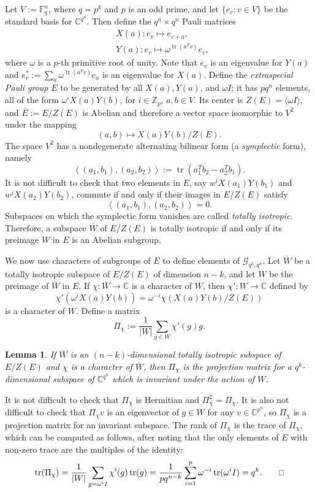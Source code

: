 \documentclass[12pt]{article}
\numberwithin{equation}{section}
\theoremstyle{plainsl}
\newtheorem{lemma}[theorem]{Lemma}
\renewenvironment{proof}{\noindent{{\sl Proof. }}}{\medbreak}
\def\sqr#1#2{{\vbox{\hrule height.#2pt
    \hbox{\vrule width.#2pt height#1pt \kern#1pt
        \vrule width.#2pt}\hrule height.#2pt}}}
\def\eqed{\tag*{\sqr53}}
\newcommand\defn[1]{\textsl{#1}}
\newcommand\om{\omega}
\newcommand\cx{{\mathbb C}}%
\newcommand\gras[2]{\mathcal{G}_{#1,#2}}
\newcommand\ff[1]{{\mathbb F}_{#1}}
\newcommand\zz[1]{{\mathbb Z}_{#1}}
\newcommand\ip[2]{\left\langle#1,#2\right\rangle}
\newcommand\opk[1]{\mathop{\mathrm{#1}}\nolimits}
\newcommand\tr{\opk{tr}}
\begin{document}
Let $V := \ff{q}^n$, where $q = p^k$ and $p$ is an odd prime, and let $\{e_v: v \in V\}$ be the standard basis for $\cx^{q^n}$. Then define the $q^n \times q^n$ Pauli matrices
\begin{align*}
& X(a): e_v \mapsto e_{v+a}, \\
& Y(a): e_v \mapsto \om^{\tr(a^Tv)} e_v,
\end{align*}
where $\om$ is a $p$-th primitive root of unity. Note that $e_v$ is an eigenvalue for $Y(a)$ and $e_v^* := \sum_a \om^{\tr(a^Tv)} e_a$ is an eigenvalue for $X(a)$. Define the \defn{extraspecial Pauli group} $E$ to be generated by all $X(a), Y(a)$, and $\om I$; it has $pq^n$ elements, all of the form $\om^iX(a)Y(b)$, for $i \in \zz{p}$, $a,b \in V$. Its center is $Z(E) = \langle \om I \rangle$, and $\overline{E} := E/Z(E)$ is Abelian and therefore a vector space isomorphic to $V^2$ under the mapping 
\[
(a,b) \mapsto X(a)Y(b)/Z(E).
\]
The space $V^2$ has a nondegenerate alternating bilinear form (a \defn{symplectic} form), namely
\[
\ip{(a_1,b_1)}{(a_2,b_2)} := \tr(a_1^Tb_2 - a_2^Tb_1).
\]
It is not difficult to check that two elements in $E$, say $w^iX(a_1)Y(b_1)$ and $w^jX(a_2)Y(b_2)$, commute if and only if their images in $E/Z(E)$ satisfy 
\[
\ip{(a_1,b_1)}{(a_2,b_2)} = 0.
\]
Subspaces on which the symplectic form vanishes are called \defn{totally isotropic}. Therefore, a subspace $\overline{W}$ of $E/Z(E)$ is totally isotropic if and only if its preimage $W$ in $E$ is an Abelian subgroup.

We now use characters of subgroups of $E$ to define elements of $\gras{q^k}{q^n}$. Let $\overline{W}$ be a totally isotropic subspace of $E/Z(E)$ of dimension $n-k$, and let $W$ be the preimage of $\overline{W}$ in $E$. If $\chi: \overline{W} \rightarrow \cx$ is a character of $\overline{W}$, then $\chi': W \rightarrow \cx$ defined by
\[
\chi'(\om^iX(a)Y(b)) = \om^{-i}\chi(X(a)Y(b)/Z(E))
\]
is a character of $W$. Define a matrix 
\[
\Pi_\chi := \frac{1}{|W|} \sum_{g \in W} \chi'(g)g.
\]

\begin{lemma}
\label{lem:isosub}
If $\overline{W}$ is an $(n-k)$-dimensional totally isotropic subspace of $E/Z(E)$ and $\chi$ is a character of $\overline{W}$, then $\Pi_\chi$ is the projection matrix for a $q^k$-dimensional subspace of $\cx^{q^n}$ which is invariant under the action of $W$.
\end{lemma}

\begin{proof} 
It is not difficult to check that $\Pi_\chi$ is Hermitian and $\Pi_\chi^2 = \Pi_\chi$. It is also not difficult to check that $\Pi_\chi v$ is an eigenvector of $g \in W$ for any $v \in \cx^{p^n}$, so $\Pi_\chi$ is a projection matrix for an invariant subspace. The rank of $\Pi_\chi$ is the trace of $\Pi_\chi$, which can be computed as follows, after noting that the only elements of $E$ with non-zero trace are the multiples of the identity:
\[
\tr(\Pi_\chi) = \frac{1}{|W|} \sum_{g = \om^iI} \chi'(g)\tr(g) = \frac{1}{pq^{n-k}} \sum_{i = 1}^p \om^{-i} \tr(\om^iI) = q^k. \eqed
\]
\end{proof} 
\end{document}
